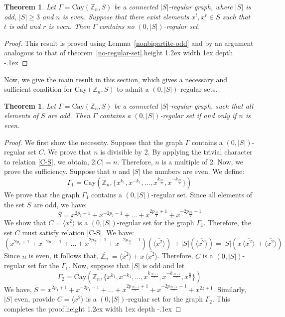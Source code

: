 \documentclass[12pt]{article}
\def\bull{\vrule height 1.2ex width 1ex depth -.1ex }
\newtheorem{thm}[formula]{Theorem}
\begin{document}
\begin{thm}\label{no-regular-set-odd}
Let $\Gamma = \mathrm{Cay}(\mathbb{Z}_n, S)$ be a connected $|S|$-regular graph, where $|S|$ is odd, $|S|\geq3 $ and $n$ is even. Suppose that  there exist elements $x^t, x^r \in S$ such that $t$ is odd and $r$ is even. Then $\Gamma$ contains no $(0,|S|)$-regular set.		
\end{thm}
\begin{proof}	
This result is proved using Lemma~\ref{nonbipartite-odd} and by an argument analogous to that of theorem~\ref{no-regular-set}.\hfill\bull   	
\end{proof}
Now, we give the main result in this section, which gives a necessary and sufficient condition for $\mathrm{Cay}(\mathbb{Z}_n, S)$ to admit a $(0,|S|)$-regular sets.

\begin{thm}\label{admit-$(0,|S|)$}
Let $\Gamma = \mathrm{Cay}(\mathbb{Z}_n, S)$ be a connected $|S|$-regular graph, such that all elements of $S$	are odd. Then $\Gamma$ contains a $(0,|S|)$-regular set if and only if $n$ is even.
\end{thm}
\begin{proof}
	We first show the necessity. Suppose that the graph $\Gamma$ contains a $(0,|S|)$-regular set $C$. We prove that $n$ is divisible by 2. By applying the trivial character to relation \eqref{C-S}, we obtain,  $2 |C| = n$. Therefore, $n$ is a multiple of 2. Now, we prove the sufficiency. Suppose that $n$ and $|S|$ the numbers are even. We define:
	\[
	\Gamma_1 = \mathrm{Cay}(\mathbb{Z}_n, \{x^{k_1}, x^{-k_1}, \dots, x^{k_{\frac{|S|}{2}}}, x^{-k_{\frac{|S|}{2}}}\})
	\]
	We prove that the graph $\Gamma_1$ contains a $(0,|S|)$-regular set. Since all elements of the set $S$ are odd, we have:
	 \[
\overline{S} = x^{2p_1+1}+x^{-2p_1-1}+ \dots+ x^{2p_\frac{|S|}{2} + 1}+x^{-2p_\frac{|S|}{2} - 1}
	 \]
We show that $C=\langle x^2 \rangle$ is a $(0,|S|)$-regular set for the graph  $\Gamma_1$. Therefore, the set $C$ must satisfy relation \eqref{C-S}. We have:
\[
(x^{2p_1+1}+x^{-2p_1-1}+ \dots+ x^{2p_\frac{|S|}{2} + 1}+x^{-2p_\frac{|S|}{2} - 1}) (\overline{\langle x^2 \rangle})\, +  |S|(\overline{\langle x^2 \rangle}) = |S|(x\, \overline{\langle x^2 \rangle}\,+ \overline{\langle x^2 \rangle})
\]
Since $n$ is even, it follows that, $\overline{\mathbb{Z}_n} \ = \overline{\langle x^2 \rangle} + x\,\overline{\langle x^2 \rangle}$. Therefore, $C$ is a $(0,|S|)$-regular set for the $\Gamma_1$. Now, suppose that $|S|$ is odd and let
	\[
\Gamma_2 = \mathrm{Cay}(\mathbb{Z}_n, \{x^{k_1}, x^{-k_1}, \dots, x^{k_{\frac{|S|-1}{2}}}, x^{-k_{\frac{|S|-1}{2}}}, x^{\frac{n}{2}}\})
\]
We have, $\overline{S} = x^{2p_1+1}+x^{-2p_1-1}+ \dots+ x^{2p_\frac{|S|-1}{2} + 1}+x^{-2p_\frac{|S|-1}{2}-1} + x^{2 z + 1}$. Similarly, $|S|$ even, provide $C=\langle x^2 \rangle$ is a $(0,|S|)$-regular set for the graph  $\Gamma_2$. This completes the proof.\hfill\bull 	
\end{proof}
\end{document}
